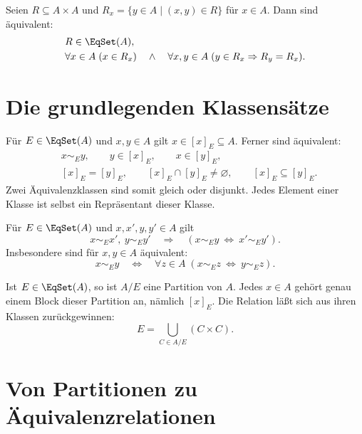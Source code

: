 \begin{theorem}
\label{b11guide:thm:rowcriterion}
Seien $R\subseteq A\times A$ und
$R_x=\{y\in A\mid(x,y)\in R\}$ für $x\in A$.
Dann sind äquivalent:
\[
\begin{aligned}
 &R\in\EqSet(A),\\
 &\forall x\in A\;(x\in R_x)
 \quad\land\quad
 \forall x,y\in A\;(y\in R_x\Rightarrow R_y=R_x).
\end{aligned}
\]
\end{theorem}

\section{Die grundlegenden Klassensätze}

\begin{theorem}
\label{b11guide:thm:class}
Für $E\in\EqSet(A)$ und $x,y\in A$ gilt
$x\in[x]_E\subseteq A$. Ferner sind äquivalent:
\[
\begin{aligned}
 &x\sim_E y,\qquad y\in[x]_E,\qquad x\in[y]_E,\\
 &[x]_E=[y]_E,\qquad [x]_E\cap[y]_E\ne\varnothing,\qquad
 [x]_E\subseteq[y]_E.
\end{aligned}
\]
Zwei Äquivalenzklassen sind somit gleich oder disjunkt.
Jedes Element einer Klasse ist selbst ein Repräsentant dieser Klasse.
\end{theorem}

\begin{theorem}
\label{b11guide:thm:substitution}
Für $E\in\EqSet(A)$ und $x,x',y,y'\in A$ gilt
\[
 x\sim_E x',\ y\sim_E y'
 \quad\Rightarrow\quad
 (x\sim_E y\ \Longleftrightarrow\ x'\sim_E y').
\]
Insbesondere sind für $x,y\in A$ äquivalent:
\[
 x\sim_E y
 \quad\Longleftrightarrow\quad
 \forall z\in A\;(x\sim_E z\ \Longleftrightarrow\ y\sim_E z).
\]
\end{theorem}

\begin{theorem}[Zerlegungssatz]\label{b11guide:thm:partition}
Ist $E\in\EqSet(A)$, so ist $A/E$ eine Partition von $A$.
Jedes $x\in A$ gehört genau einem Block dieser Partition an,
nämlich $[x]_E$. Die Relation läßt sich aus ihren Klassen
zurückgewinnen:
\[
 E=\bigcup_{C\in A/E}(C\times C).
\]
\end{theorem}

\section{Von Partitionen zu Äquivalenzrelationen}

